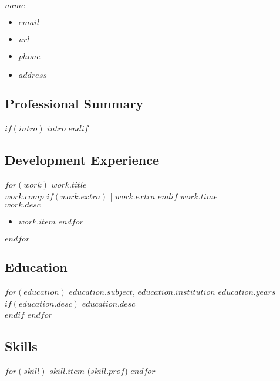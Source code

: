 \documentclass[$fontsize$, letter]{article}
\newcommand{\heading}[1]{
    \hrulefill \vspace{-0.5cm} \subsection*{{\color{gray} #1}}
}
\begin{document}
\begin{minipage}[t]{0.4\textwidth}
    {\Huge $name$}\\[.2cm]
\end{minipage}
\hfill
\begin{minipage}[b][2cm][b]{0.4\textwidth}
    \begin{itemize}[label={}, align=right]
        \item \hfill $email$
        \item \hfill \href{https://$url$}{$url$}
        \item \hfill $phone$
        \item \hfill $address$
    \end{itemize}
\end{minipage}

\heading{Professional Summary}
$if(intro)$
    \textsc{$intro$}
$endif$

\heading{Development Experience}
$for(work)$
    {\large $work.title$}\\
    {\color{gray}
    $work.comp$
    $if(work.extra)$ \big| $work.extra$ $endif$
    \hspace*{\fill} $work.time$}
    \\
    $work.desc$\\
    \vspace{-\baselineskip}
    \begin{itemize}
    $for(work.item)$
        \item $work.item$
    $endfor$
    \end{itemize}
$endfor$
    
\heading{Education}
$for(education)$
    $education.subject$, $education.institution$
    \hspace*{\fill} {\color{gray} $education.years$}\\
    $if(education.desc)$ $education.desc$\\ $endif$
    \vspace{-\baselineskip}
$endfor$

\heading{Skills}
$for(skill)$
    {$skill.item$ ($skill.prof$)}
$endfor$
\end{document}
